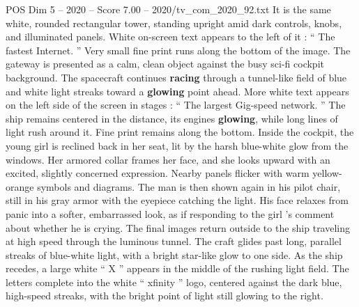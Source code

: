 \begin{textsample}{POS Dim 5 – 2020 – Score 7.00 – 2020/tv\_com\_2020\_92.txt}
It is the same white, rounded rectangular tower, standing upright amid dark controls, knobs, and illuminated panels.
White on-screen text appears to the left of it : “ The fastest Internet. ” Very small fine print runs along the bottom of the image.
The gateway is presented as a calm, clean object against the busy sci-fi cockpit background.
The spacecraft continues \textbf{racing} through a tunnel-like field of blue and white light streaks toward a \textbf{glowing} point ahead.
More white text appears on the left side of the screen in stages : “ The largest Gig-speed network. ” The ship remains centered in the distance, its engines \textbf{glowing}, while long lines of light rush around it.
Fine print remains along the bottom.
Inside the cockpit, the young girl is reclined back in her seat, lit by the harsh blue-white glow from the windows.
Her armored collar frames her face, and she looks upward with an excited, slightly concerned expression.
Nearby panels flicker with warm yellow-orange symbols and diagrams.
The man is then shown again in his pilot chair, still in his gray armor with the eyepiece catching the light.
His face relaxes from panic into a softer, embarrassed look, as if responding to the girl ’s comment about whether he is crying.
The final images return outside to the ship traveling at high speed through the luminous tunnel.
The craft glides past long, parallel streaks of blue-white light, with a bright star-like glow to one side.
As the ship recedes, a large white “ X ” appears in the middle of the rushing light field.
The letters complete into the white “ xfinity ” logo, centered against the dark blue, high-speed streaks, with the bright point of light still glowing to the right.

\end{textsample}
